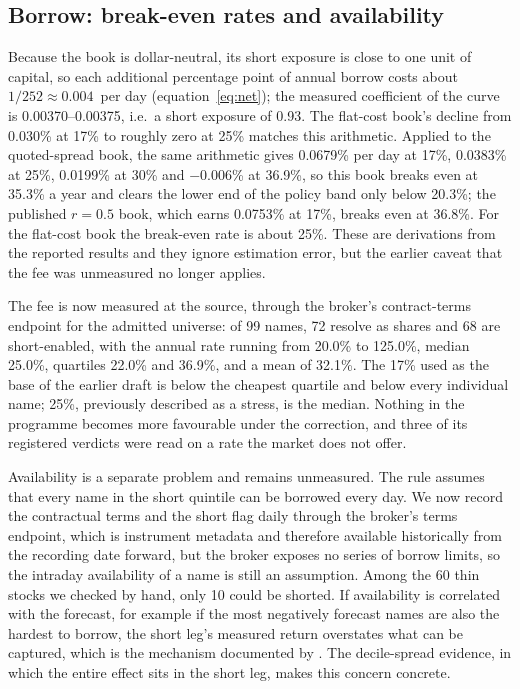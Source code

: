 \subsection{Borrow: break-even rates and availability}\label{sec:borrow}

Because the book is dollar-neutral, its short exposure is close to one unit of capital, so each additional percentage point of annual borrow costs about $1/252\approx0.004$\pp\ per day (equation~\ref{eq:net}); the measured coefficient of the curve is 0.00370--0.00375, i.e.\ a short exposure of 0.93. The flat-cost book's decline from 0.030\% at 17\% to roughly zero at 25\% matches this arithmetic. Applied to the quoted-spread book, the same arithmetic gives 0.0679\% per day at 17\%, 0.0383\% at 25\%, 0.0199\% at 30\% and $-0.006$\% at 36.9\%, so this book breaks even at 35.3\% a year and clears the lower end of the policy band only below 20.3\%; the published $r=0.5$ book, which earns 0.0753\% at 17\%, breaks even at 36.8\%. For the flat-cost book the break-even rate is about 25\%. These are derivations from the reported results and they ignore estimation error, but the earlier caveat that the fee was unmeasured no longer applies.

The fee is now measured at the source, through the broker's contract-terms endpoint for the admitted universe: of 99 names, 72 resolve as shares and 68 are short-enabled, with the annual rate running from 20.0\% to 125.0\%, median 25.0\%, quartiles 22.0\% and 36.9\%, and a mean of 32.1\%. The 17\% used as the base of the earlier draft is below the cheapest quartile and below every individual name; 25\%, previously described as a stress, is the median. Nothing in the programme becomes more favourable under the correction, and three of its registered verdicts were read on a rate the market does not offer.

Availability is a separate problem and remains unmeasured. The rule assumes that every name in the short quintile can be borrowed every day. We now record the contractual terms and the short flag daily through the broker's terms endpoint, which is instrument metadata and therefore available historically from the recording date forward, but the broker exposes no series of borrow limits, so the intraday availability of a name is still an assumption. Among the 60 thin stocks we checked by hand, only 10 could be shorted. If availability is correlated with the forecast, for example if the most negatively forecast names are also the hardest to borrow, the short leg's measured return overstates what can be captured, which is the mechanism documented by \citet{muravyev2025}. The decile-spread evidence, in which the entire effect sits in the short leg, makes this concern concrete.

